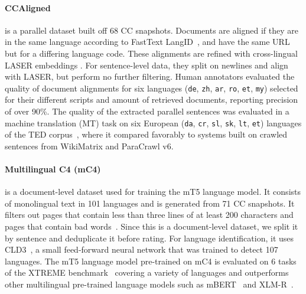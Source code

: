 
\paragraph{CCAligned~\citep{el-kishky-etal-2020-ccaligned}}is a %
parallel dataset built off 68 CC snapshots. Documents are aligned if they are in the same language according to FastText LangID~\citep{joulin-etal-2016-fasttext,joulin-etal-2017-bag}, and have the same URL but for a differing language code. These alignments are refined with cross-lingual LASER embeddings \citep{artetxe-schwenk-2019-massively}. For sentence-level data, they split on newlines and align with LASER, but perform no further filtering.
Human annotators evaluated the quality of document alignments for six languages (\texttt{de}, \texttt{zh}, \texttt{ar}, \texttt{ro}, \texttt{et}, \texttt{my}) selected for their different scripts and amount of retrieved documents, reporting precision of over 90\%.
The quality of the extracted parallel sentences was evaluated in a machine translation (MT) task on six European (\texttt{da}, \texttt{cr}, \texttt{sl}, \texttt{sk}, \texttt{lt}, \texttt{et}) languages of the TED corpus~\citep{qi-etal-2018-pre}, where it compared favorably to systems built on crawled sentences from WikiMatrix and ParaCrawl v6. %

\paragraph{Multilingual C4 (mC4)~\citep{xue-etal-2021-mt5}} is a document-level dataset used for training the mT5 language model. It consists of monolingual text in 101 languages and is generated from 71 CC snapshots. It filters out pages that contain less than three lines of at least 200 characters and pages that contain bad words~\citep{emerick2018list}. Since this is a document-level dataset, we split it by sentence and deduplicate it before rating. For language identification, it uses CLD3~\citep{botha-etal-2017-natural}, a small feed-forward neural network that was trained to detect 107 languages.
The mT5 language model pre-trained on mC4
is evaluated on 6 tasks of the XTREME benchmark~\citep{hu2020xtreme} covering a variety of languages and outperforms other multilingual pre-trained language models such as mBERT~\citep{devlin-etal-2019-bert} and XLM\nobreakdash-R~\citep{conneau-etal-2020-unsupervised}.%


